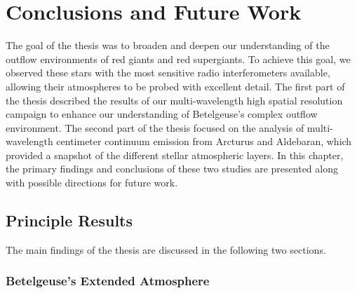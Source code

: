 \chapter{Conclusions and Future Work}
\label{chap:8}

The goal of the thesis was to broaden and deepen our understanding of the outflow environments of red giants and red supergiants. To achieve this goal, we observed these stars with the most sensitive radio interferometers available, allowing their atmospheres to be probed with excellent detail. The first part of the thesis described the results of our multi-wavelength high spatial resolution campaign to enhance our understanding of Betelgeuse's complex outflow environment. The second part of the thesis focused on the analysis of multi-wavelength centimeter continuum emission from Arcturus and Aldebaran, which provided a snapshot of the different stellar atmospheric layers. In this chapter, the primary findings and conclusions of these two studies are presented along with possible directions for future work.

\pagebreak

\section{Principle Results}\label{sec:8.1}
The main findings of the thesis are discussed in the following two sections.
\subsection{Betelgeuse's Extended Atmosphere}\label{sec:8.1.1}

